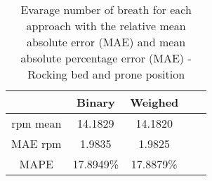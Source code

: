 
\begin{table}[h]

    \centering

\begin{tabular}{|c|c|c|c|c|}
\hline 
& Binary & Weighed \\ 
 
\hline 
rpm mean & 14.1829  & 14.1820   \\  
MAE rpm   &   1.9835&      1.9825 \\ 
MAPE   & 17.8949\% &  17.8879\% \\ 

\hline 
\end{tabular}
\caption{Evarage number of breath for each approach with the relative mean
absolute error (MAE) and mean absolute percentage error (MAE) - Rocking bed
and prone position}
\label{tab:ProneRockingMetricssg}
\end{table}